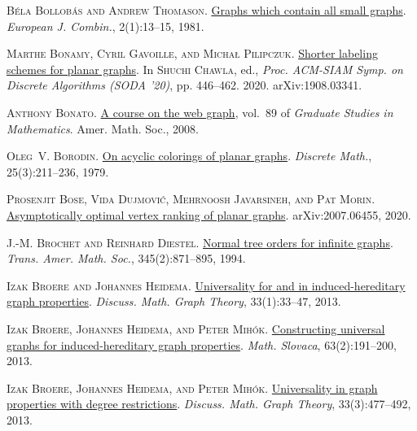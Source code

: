 \documentclass[a4paper,11pt]{article}
\theoremstyle{plain}
\theoremstyle{definition}
\begin{document}
\textsc{B\'{e}la Bollob\'{a}s and Andrew Thomason}.
\newblock \href{https://doi.org/10.1016/S0195-6698(81)80015-7}{Graphs which
  contain all small graphs}.
\newblock \emph{European J. Combin.}, 2(1):13--15, 1981.

\textsc{Marthe Bonamy, Cyril Gavoille, and Michał Pilipczuk}.
\newblock \href{https://doi.org/10.1137/1.9781611975994.27}{Shorter labeling
  schemes for planar graphs}.
\newblock In \textsc{Shuchi Chawla}, ed., \emph{Proc. ACM-SIAM Symp. on
  Discrete Algorithms (SODA '20)}, pp. 446--462. 2020.
\newblock arXiv:1908.03341.

\textsc{Anthony Bonato}.
\newblock \href{https://doi.org/10.1090/gsm/089}{A course on the web graph},
  vol.~89 of \emph{Graduate Studies in Mathematics}.
\newblock Amer. Math. Soc., 2008.

\textsc{Oleg~V. Borodin}.
\newblock \href{https://doi.org/10.1016/0012-365X(79)90077-3}{On acyclic
  colorings of planar graphs}.
\newblock \emph{Discrete Math.}, 25(3):211--236, 1979.

\textsc{Prosenjit Bose, Vida Dujmovi\'c, Mehrnoosh Javarsineh, and Pat Morin}.
\newblock \href{http://arxiv.org/abs/2007.06455}{Asymptotically optimal vertex
  ranking of planar graphs}.
\newblock arXiv:2007.06455, 2020.

\textsc{J.-M. Brochet and Reinhard Diestel}.
\newblock \href{https://doi.org/10.2307/2155004}{Normal tree orders for
  infinite graphs}.
\newblock \emph{Trans. Amer. Math. Soc.}, 345(2):871--895, 1994.

\textsc{Izak Broere and Johannes Heidema}.
\newblock \href{https://doi.org/10.7151/dmgt.1671}{Universality for and in
  induced-hereditary graph properties}.
\newblock \emph{Discuss. Math. Graph Theory}, 33(1):33--47, 2013.

\textsc{Izak Broere, Johannes Heidema, and Peter Mih\'{o}k}.
\newblock \href{https://doi.org/10.2478/s12175-012-0092-z}{Constructing
  universal graphs for induced-hereditary graph properties}.
\newblock \emph{Math. Slovaca}, 63(2):191--200, 2013{}.

\textsc{Izak Broere, Johannes Heidema, and Peter Mih\'{o}k}.
\newblock \href{https://doi.org/10.7151/dmgt.1696}{Universality in graph
  properties with degree restrictions}.
\newblock \emph{Discuss. Math. Graph Theory}, 33(3):477--492,
  2013{}.
\end{document}
